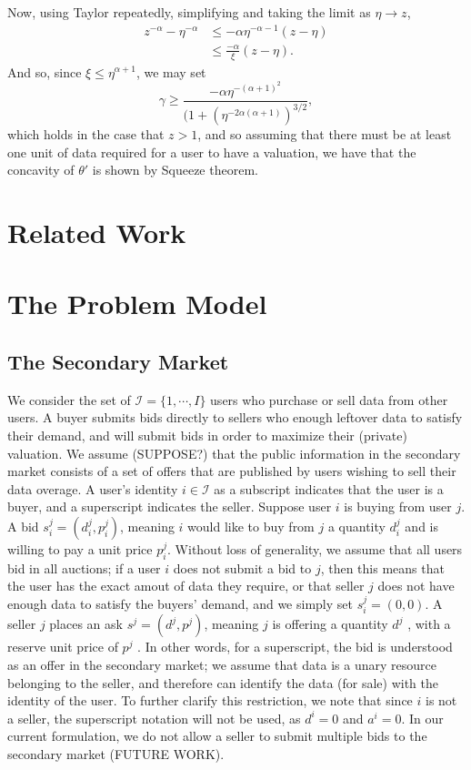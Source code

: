 \documentclass[12pt]{article}
\theoremstyle{definition}
\newcommand{\mcI}{\mathcal{I}}
\begin{document}
\begin{multicols}{2}
\begin{itemize}
Now, using Taylor repeatedly, simplifying and taking the limit as $\eta \rightarrow z$,
\begin{align*}
    z^{-\alpha} - \eta^{-\alpha} &\le -\alpha\eta^{-\alpha-1}(z-\eta) \\
    & \le \frac{-\alpha}{\xi}(z-\eta).
\end{align*}
And so, since $\xi \le \eta^{\alpha+1}$,
we may set
$$
    \gamma \ge
\frac{-\alpha\eta^{-(\alpha+1)^2}}{\big(1+(\eta^{-2\alpha(\alpha+1)})^{3/2}},
$$
which holds in the case that $z > 1$, and so assuming that there must be at least one
unit of data required for a user to have
a valuation,  we have that the concavity of $\theta'$ is shown by Squeeze theorem.
\end{itemize}
\fi


\section{Related Work}

\section{The Problem Model}
\subsection{The Secondary Market}

We consider the set of $\mcI = \lbrace 1, \cdots, I\rbrace$ users who purchase or sell
data from other users. A buyer submits bids directly to sellers who enough leftover data
to satisfy their demand, and will submit bids in order to maximize their
(private) valuation. We assume (SUPPOSE?) that the public information in the
secondary market consists of a set of offers that are published by users
wishing to sell their data overage. 
A user's identity $i \in \mcI$ as a subscript indicates that the user
is a buyer, and a superscript indicates the seller.
Suppose user $i$ is buying from user $j$. A bid $s_i^j = (d_i^j, p_i^j)$,
meaning $i$ would like to buy from $j$ a quantity $d^j_i$ and is willing to pay
a unit price $p^j_i$. Without loss of generality, we assume that all users bid in all
auctions; if a user $i$ does not submit a bid to $j$, then this means that
the user has the exact amout of data they require, or that seller $j$ does not have
enough data to satisfy the buyers' demand, and we simply set $s_i^j = (0, 0)$.
A seller $j$ places an ask $s^j = (d^j, p^j)$, meaning $j$ is offering a
quantity $d^j$ , with a reserve unit price of $p^j$ . In other words, for a
superscript, the bid is understood as an offer in the secondary
market; we assume that data is a unary resource belonging to the seller, and
therefore can identify the data (for sale) with the identity of the user.
To further clarify this restriction, we note that since $i$ is not a seller,
the superscript notation will not be used, as $d^i = 0$ and
$a^i = 0$. In our current formulation, we do not allow a seller to submit
multiple bids to the secondary market (FUTURE WORK).


\end{multicols}
\end{document}
